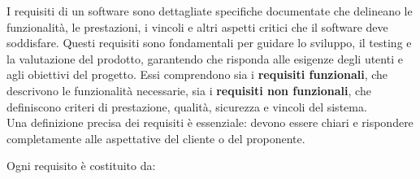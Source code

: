 I requisiti di un software sono dettagliate specifiche documentate che delineano le funzionalità, le prestazioni, i vincoli e altri aspetti critici che il software deve soddisfare. Questi requisiti sono fondamentali per guidare lo sviluppo, il testing e la valutazione del prodotto, garantendo che risponda alle esigenze degli utenti e agli obiettivi del progetto. Essi comprendono sia i \textbf{requisiti funzionali}, che descrivono le funzionalità necessarie, sia i \textbf{requisiti non funzionali}, che definiscono criteri di prestazione, qualità, sicurezza e vincoli del sistema.\\
Una definizione precisa dei requisiti è essenziale: devono essere chiari e rispondere completamente alle aspettative del cliente o del proponente.

Ogni requisito è costituito da:
